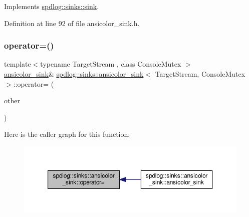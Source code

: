 Implements \hyperlink{classspdlog_1_1sinks_1_1sink_a51d8f34ad79064e0dc13c6013236e427}{spdlog\+::sinks\+::sink}.



Definition at line 92 of file ansicolor\+\_\+sink.\+h.

\mbox{\label{classspdlog_1_1sinks_1_1ansicolor__sink_a7d2fcd5a2f9a3f02e64648a609a45fb1}} 
\subsubsection{\texorpdfstring{operator=()}{operator=()}}
{\footnotesize\ttfamily template$<$typename Target\+Stream , class Console\+Mutex $>$ \\
\hyperlink{classspdlog_1_1sinks_1_1ansicolor__sink}{ansicolor\+\_\+sink}\& \hyperlink{classspdlog_1_1sinks_1_1ansicolor__sink}{spdlog\+::sinks\+::ansicolor\+\_\+sink}$<$ Target\+Stream, Console\+Mutex $>$\+::operator= (\begin{DoxyParamCaption}\item[{const \hyperlink{classspdlog_1_1sinks_1_1ansicolor__sink}{ansicolor\+\_\+sink}$<$ Target\+Stream, Console\+Mutex $>$ \&}]{other }\end{DoxyParamCaption})\hspace{0.3cm}{\ttfamily [delete]}}

Here is the caller graph for this function\+:
\nopagebreak
\begin{figure}[H]
\begin{center}
\leavevmode
\includegraphics[width=350pt]{classspdlog_1_1sinks_1_1ansicolor__sink_a7d2fcd5a2f9a3f02e64648a609a45fb1_icgraph}
\end{center}
\end{figure}
\mbox{\label{classspdlog_1_1sinks_1_1ansicolor__sink_ad19df81408ed6dbbe62fe4a1e5a7fca8}} 
